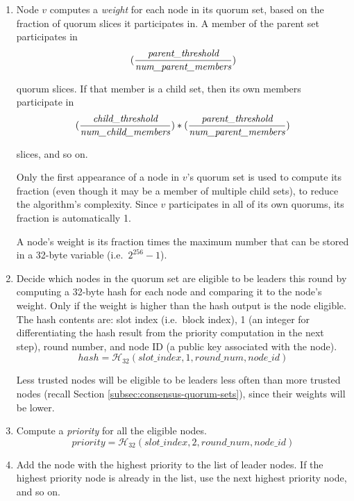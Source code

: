 \begin{enumerate}
    \item Node $v$ computes a {\em weight} for each node in its quorum set, based on the fraction of quorum slices it participates in. A member of the parent set participates in\vspace{.115cm}
    \[(\frac{\textrm{\em parent\_threshold}}{\textrm{\em num\_parent\_members}})\]
    
    quorum slices. If that member is a child set, then its own members participate in\vspace{.115cm}
    \[(\frac{\textrm{\em child\_threshold}}{\textrm{\em num\_child\_members}})*(\frac{\textrm{\em parent\_threshold}}{\textrm{\em num\_parent\_members}})\]
    
    slices, and so on.

    Only the first appearance of a node in $v$'s quorum set is used to compute its fraction (even though it may be a member of multiple child sets), to reduce the algorithm's complexity. Since $v$ participates in all of its own quorums, its fraction is automatically 1.

    A node's weight is its fraction times the maximum number that can be stored in a 32-byte variable (i.e.\ $2^{256} - 1$).
    
    \item Decide which nodes in the quorum set are eligible to be leaders this round by computing a 32-byte hash for each node and comparing it to the node's weight. Only if the weight is higher than the hash output is the node eligible. The hash contents are: slot index (i.e.\ block index), 1 (an integer for differentiating the hash result from the priority computation in the next step), round number, and node ID (a public key associated with the node).\vspace{.155cm}
    \[hash  = \mathcal{H}_{32}(slot\_index, 1, round\_num, node\_id)\]
    
    Less trusted nodes will be eligible to be leaders less often than more trusted nodes (recall Section \ref{subsec:consensus-quorum-sets}), since their weights will be lower.

    \item Compute a {\em priority} for all the eligible nodes.\vspace{.155cm}
    \[priority  = \mathcal{H}_{32}(slot\_index, 2, round\_num, node\_id)\]

    \item Add the node with the highest priority to the list of leader nodes. If the highest priority node is already in the list, use the next highest priority node, and so on.
\end{enumerate}

